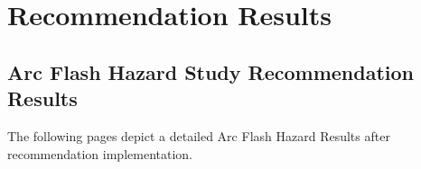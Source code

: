 \section{Recommendation Results}
\label{af:modifications}

\subsection{Arc Flash Hazard Study Recommendation Results}
\label{af:observations:at}

The following pages depict a detailed Arc Flash Hazard Results after recommendation implementation.
